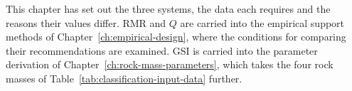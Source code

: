 This chapter has set out the three systems, the data each requires and the
reasons their values differ. RMR and $Q$ are carried into the empirical
support methods of Chapter~\ref{ch:empirical-design}, where the conditions for
comparing their recommendations are examined. GSI is carried into the
parameter derivation of Chapter~\ref{ch:rock-mass-parameters}, which takes the
four rock masses of Table~\ref{tab:classification-input-data} further.

\chapterreferences

